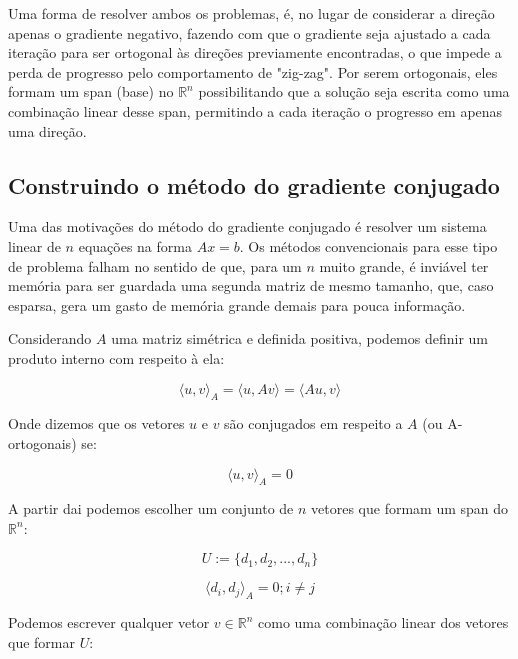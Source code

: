 Uma forma de resolver ambos os problemas, é, no lugar de considerar a direção
apenas o gradiente negativo, fazendo com que o gradiente seja ajustado a cada
iteração para ser ortogonal às direções previamente encontradas, o que impede
a perda de progresso pelo comportamento de "zig-zag". Por serem ortogonais,
eles formam um span (base) no \( \mathbb{R}^n \) possibilitando que a solução
seja escrita como uma combinação linear desse span, permitindo a cada iteração
o progresso em apenas uma direção.

\subsection{Construindo o método do gradiente conjugado}

Uma das motivações do método do gradiente conjugado \cite{bonnans2006numerical}
\cite{1987polyak} é resolver um sistema linear de \(n\) equações na forma \(Ax = b \).
Os métodos convencionais para esse tipo de problema falham no sentido de que, para um
\(n\) muito grande, é inviável ter memória para ser guardada uma segunda matriz de
mesmo tamanho, que, caso esparsa, gera um gasto de memória grande demais para pouca
informação.

Considerando \(A\) uma matriz simétrica e definida positiva, podemos definir um produto
interno com respeito à ela:

\begin{equation}
\langle u, v \rangle_A = \langle u, Av \rangle =  \langle Au, v \rangle 
\end{equation}

Onde dizemos que os vetores \(u\) e \(v\) são conjugados em respeito a \(A\) (ou A-ortogonais) se:

\begin{equation}
\label{aortogonal}
\langle u, v \rangle_A = 0
\end{equation}

A partir dai podemos escolher um conjunto de \(n\) vetores que formam um span do
\( \mathbb{R}^n \):

\begin{equation}
U := \{d_1, d_2, ..., d_n\}
\end{equation}

\begin{equation}
\label{gc_prod_interno}
\langle d_i, d_j \rangle_A = 0; i \ne j
\end{equation}

Podemos escrever qualquer vetor \(v \in \mathbb{R}^n\) como uma combinação linear dos
vetores que formar \(U\):

